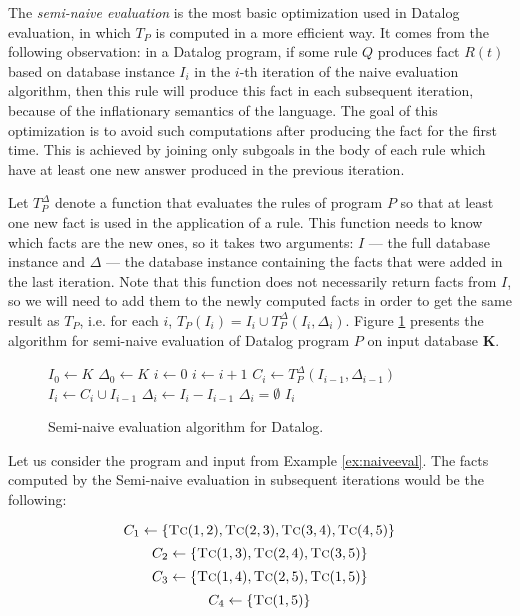 The \emph{semi-naive evaluation} is the most basic optimization used in Datalog evaluation, in which $T_P$ is computed in a more efficient way. It comes from the following observation: in a Datalog program, if some rule $Q$ produces fact $R(t)$ based on database instance $I_i$ in the $i$-th iteration of the naive evaluation algorithm, then this rule will produce this fact in each subsequent iteration, because of the inflationary semantics of the language. The goal of this optimization is to avoid such computations after producing the fact for the first time. This is achieved by joining only subgoals in the body of each rule which have at least one new answer produced in the previous iteration. 

Let $T^\Delta_P$ denote a function that evaluates the rules of program $P$ so that at least one new fact is used in the application of a rule. This function needs to know which facts are the new ones, so it takes two arguments: $I$ --- the full database instance and $\Delta$ --- the database instance containing the facts that were added in the last iteration. Note that this function does not necessarily return facts from $I$, so we will need to add them to the newly computed facts in order to get the same result as $T_P$, i.e. for each $i$, $T_P(I_i) = I_i \cup T_P^\Delta(I_i, \Delta_i)$. Figure \ref{psc:seminaiveevaldatalog} presents the algorithm for semi-naive evaluation of Datalog program $P$ on input database \textbf{K}.

\begin{figure}[!htbp]
\begin{codebox}
  \li $I_0 \leftarrow K$
  \li $\Delta_0 \leftarrow K$
  \li $i \leftarrow 0$
  \li \Repeat
	\li $i \leftarrow i + 1$
	\li $C_i \leftarrow T_P^\Delta(I_{i-1}, \Delta_{i-1})$
	\li $I_i \leftarrow C_i \cup I_{i-1}$
	\li $\Delta_i \leftarrow I_i - I_{i-1}$
  \li \Until $\Delta_i = \emptyset$
  \li \Return $I_i$
\end{codebox}
\caption{Semi-naive evaluation algorithm for Datalog.}\label{psc:seminaiveevaldatalog}
\end{figure}

\begin{exmp}
Let us consider the program and input from Example \ref{ex:naiveeval}. The facts computed by the Semi-naive evaluation in subsequent iterations would be the following:

$$C_1 \leftarrow \{\textsc{Tc}(1, 2), \textsc{Tc}(2, 3), \textsc{Tc}(3, 4), \textsc{Tc}(4, 5)\}$$
$$C_2 \leftarrow \{\textsc{Tc}(1, 3), \textsc{Tc}(2, 4), \textsc{Tc}(3, 5)\}$$
$$C_3 \leftarrow \{\textsc{Tc}(1, 4), \textsc{Tc}(2, 5), \textsc{Tc}(1, 5)\}$$
$$C_4 \leftarrow \{\textsc{Tc}(1, 5)\}$$
\label{ex:semieval}
\end{exmp}

